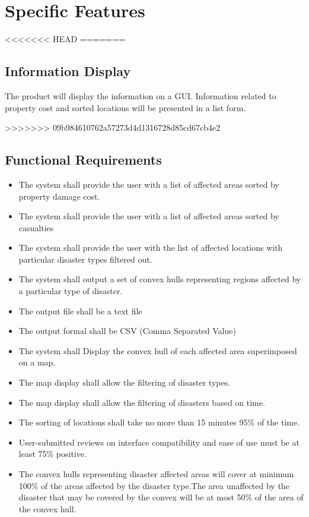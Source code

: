\documentclass{article}
\begin{document}
 
\section{Specific Features }
<<<<<<< HEAD
=======
\subsection{Information Display}
The product will display the information on a GUI. Information related to property cost and 
sorted locations will be presented in a list form.

>>>>>>> 09b984610762a57273d4d1316728d85cd67cb4e2
\subsection{Functional Requirements}
    \begin{itemize}
        \item The system shall provide the user with a list of affected areas sorted by property damage cost.
        \item The system shall provide the user with a list of affected areas sorted by casualties
        \item The system shall provide the user with the list of affected locations with particular disaster types filtered out.
        \item The system shall output a set of convex hulls representing regions affected by a particular type of disaster.
        \item The output file shall be a text file
        \item The output formal shall be CSV (Comma Separated Value)
        \item The system shall Display the convex hull of each affected area superimposed on a map.
        \item The map display shall allow the filtering of disaster types.
        \item The map display shall allow the filtering of disasters based on time.
        \item The sorting of locations shall take no more than 15 minutes 95\% of the time.
        \item User-submitted reviews on interface compatibility and ease of use must be at least 75\% positive.
        \item The convex hulls representing disaster affected areas will cover at minimum 100\% of the areas affected by the disaster type.The area unaffected by the disaster that may be covered by the convex will be at most 50\% of the area of the convex hull.
    
    \end{itemize}
\end{document}
